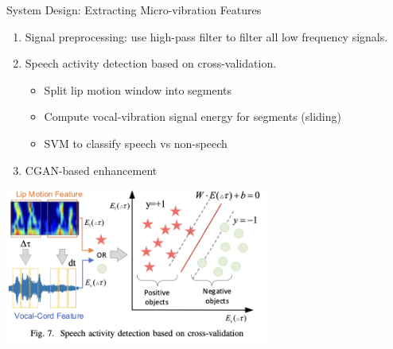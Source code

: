 \documentclass[dvipsnames, handout]{beamer}
\newcommand{\1}{\mathds{1}}	%
\begin{document}
\begin{frame}[t]{System Design: Extracting Micro-vibration Features}

\begin{enumerate}
\item Signal preprocessing: use high-pass filter to filter all low frequency signals.
\item Speech activity detection based on cross-validation.
\begin{itemize}
\item Split lip motion window into segments
\item Compute vocal-vibration signal energy for segments (sliding)
\item SVM to classify speech vs non-speech 
\end{itemize}
\item CGAN-based enhancement
\end{enumerate}

\begin{center}
\includegraphics[width=0.65\textwidth]{imgs/mmmic-fig7.png}
\end{center}

\end{frame}
\end{document}
